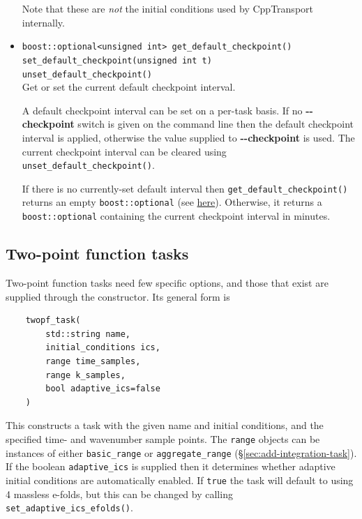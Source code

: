 \documentclass[11pt,a4paper]{article}
\newcommand{\packagefont}{\sffamily}
\newcommand{\CppTransport}{{\packagefont CppTransport}}
\newcommand{\option}[1]{{\ttfamily\bfseries\small #1}}
\begin{document}
\begin{itemize}
    Note that these are \emph{not} the initial conditions used
    by {\CppTransport} internally.
    
    \item \texttt{boost::optional<unsigned int> get_default_checkpoint()} \\
    \texttt{set_default_checkpoint(unsigned int t)} \\
    \texttt{unset_default_checkpoint()} \\
    Get or set the current default checkpoint interval.
    
    A default checkpoint interval can be set on a per-task basis.
    If no \option{{-}{-}checkpoint} switch is given on the command line then
    the default checkpoint interval is applied, otherwise the value
    supplied to \option{{-}{-}checkpoint} is used.
    The current checkpoint interval can be cleared
    using
    \texttt{unset_default_checkpoint()}.
    
    If there is no currently-set default interval then
    \texttt{get_default_checkpoint()} returns an empty
    \texttt{boost::optional}
    (see \href{http://www.boost.org/doc/libs/1_60_0/libs/optional/doc/html/index.html}{here}).
    Otherwise, it returns a
    \texttt{boost::optional} containing the current
    checkpoint interval in minutes.
    
\end{itemize}

\subsection{Two-point function tasks}
\label{sec:twopf-options}
Two-point function tasks need few specific options, and those that exist are supplied
through the constructor. Its general form is
\begin{verbatim}
    twopf_task(
        std::string name,
        initial_conditions ics,
        range time_samples,
        range k_samples,
        bool adaptive_ics=false
    )
\end{verbatim}
This constructs a task with the given name and initial conditions,
and the specified time- and wavenumber sample points.
The \texttt{range} objects can be instances of either
\texttt{basic_range}
or
\texttt{aggregate_range}
(\S\ref{sec:add-integration-task}).
If the boolean
\texttt{adaptive_ics} is supplied then it determines whether adaptive initial conditions
are automatically enabled.
If \texttt{true} the task will default to using 4 massless e-folds, but this can be
changed by calling \texttt{set_adaptive_ics_efolds()}.
\end{document}
